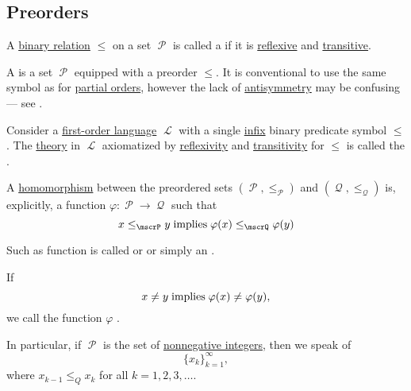 \subsection{Preorders}\label{subsec:preorders}

\begin{definition}\label{def:preordered_set}
  A \hyperref[def:binary_relation]{binary relation} \( \leq \) on a set \( \mscrP \) is called a  if it is \hyperref[def:binary_relation/reflexive]{reflexive} and \hyperref[def:binary_relation/transitive]{transitive}.

  A  is a set \( \mscrP \) equipped with a preorder \( \leq \). It is conventional to use the same symbol as for \hyperref[def:poset]{partial orders}, however the lack of \hyperref[def:binary_relation/antisymmetric]{antisymmetry} may be confusing --- see .

  \begin{thmenum}[series=def:preordered_set]
     Consider a \hyperref[def:first_order_language]{first-order language} \( \mscrL \) with a single \hyperref[rem:order_infix_notation]{infix} binary predicate symbol \( \leq \). The \hyperref[def:first_order_semantics/theory]{theory} in \( \mscrL \) axiomatized by \hyperref[def:binary_relation/reflexive]{reflexivity} and \hyperref[def:binary_relation/transitive]{transitivity} for \( \leq \) is called the .

     A \hyperref[def:first_order_homomorphism]{homomorphism} between the preordered sets \( (\mscrP, \leq_\mscrP) \) and \( (\mscrQ, \leq_\mscrQ) \) is, explicitly, a function \( \varphi: \mscrP \to \mscrQ \) such that
    \begin{equation}\label{eq:def:preordered_set/homomorphism}
      x \leq_\mscrP y \T{implies} \varphi(x) \leq_\mscrQ \varphi(y)
    \end{equation}

    Such as function is called  or  or simply an .

    If
    \begin{equation*}
      x \neq y \thickspace \text{implies} \thickspace \varphi(x) \neq \varphi(y),
    \end{equation*}
    we call the function \( \varphi \) .

    In particular, if \( \mscrP \) is the set of \hyperref[rem:peano_arithmetic_zero/nonnegative]{nonnegative integers}, then we speak of 
    \begin{equation*}
      \{ x_k \}_{k=1}^\infty,
    \end{equation*}
    where \( x_{k-1} \leq_Q x_k \) for all \( k = 1, 2, 3, \ldots \).


\end{thmenum}
\end{definition}
